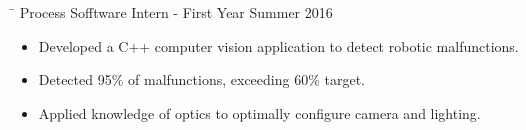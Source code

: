 \documentclass[12pt]{article}
\newcommand{\tabsize}{\hspace{4.8in}}
\newenvironment{tab2}
    {\begin{tabbing} \tabsize \= \kill}
    {\end{tabbing}}
\begin{document}
\bigskip

\begin{tab2} Process Sofftware Intern - First Year \> Summer 2016 \end {tab2}
\begin{itemize}
    \item Developed a C++ computer vision application to detect robotic malfunctions.
    \item Detected 95\% of malfunctions, exceeding 60\% target.
    \item Applied knowledge of optics to optimally configure camera and lighting.
\end{itemize}
\end{document}
